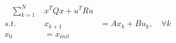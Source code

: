 \documentclass[preview]{standalone}
\begin{document}
\begin{align*}
\quad \sum_{k=1}^N \; &x^TQx + u^T R u \\ s.t. \quad &x_{k+1} &= Ax_k + Bu_k, \quad \forall k \\ x_0 &= x_{init}
\end{align*}
\end{document}
